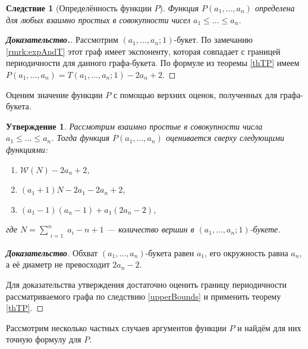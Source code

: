 \documentclass[12pt]{article}
\newtheorem{proposition}[theorem]{Утверждение}
\newtheorem{corollary}[theorem]{Следствие}
\theoremstyle{definition}
\begin{document}
\begin{corollary}[Определённость функции $P$]
Функция $P(a_1, \dots, a_n)$ определена для любых взаимно простых в совокупности чисел $a_1 \le \dots \le a_n$.
\end{corollary}
\begin{proof}[\textbf{Доказательство.}]
Рассмотрим $(a_1, \dots, a_n; 1)$-букет. По замечанию \ref{rmrk:expAndT} этот граф имеет экспоненту, которая совпадает с границей периодичности для данного графа-букета. По формуле из теоремы \ref{thTP} имеем $P(a_1, \dots, a_n) = T(a_1, \dots, a_n; 1) - 2a_n + 2$.
\end{proof}

Оценим значение функции $P$ с помощью верхних оценок, полученных для графа-букета.

\begin{proposition}
\label{upperBoundsP}
Рассмотрим взаимно простые в совокупности числа $a_1 \le \dots \le a_n$. Тогда функция $P(a_1, \dots, a_n)$ оценивается сверху следующими функциями:
\begin{enumerate}
\item $\mathcal{W}(N) - 2a_n + 2$,
\item $(a_1 + 1)N - 2a_1 - 2a_n + 2$,
\item $(a_1 - 1)(a_n - 1) + a_1(2a_n - 2)$,
\end{enumerate}
где $N = \sum\limits_{\substack{i=1}}^n a_i - n + 1$ --- количество вершин в $(a_1, \dots, a_n; 1)$-букете.
\end{proposition}
\begin{proof}[\textbf{Доказательство}]
Обхват $(a_1, \dots, a_n)$-букета равен $a_1$, его окружность равна $a_n$, а её диаметр не превосходит $2a_n - 2$.

Для доказательства утверждения достаточно оценить границу периодичности рассматриваемого графа по следствию \ref{upperBounds} и применить теорему \ref{thTP}.
\end{proof}

Рассмотрим несколько частных случаев аргументов функции $P$ и найдём для них точную формулу для $P$.
\end{document}
